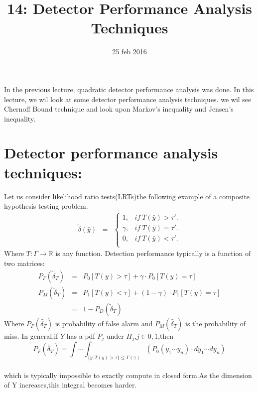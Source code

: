 \documentclass[a4paper,english,12pt]{article}
\title{14: Detector Performance Analysis Techniques}
\date{25 feb 2016}
\author{}
\begin{document}
\maketitle
\maketitle
In the previous lecture, quadratic detector performance analysis was done. In this lecture, we wil look at some detector performance analysis techniques. we wil see Chernoff Bound technique and look upon Markov's inequality and Jensen's inequality.
\section{Detector performance analysis techniques:}
Let us consider likelihood ratio tests(LRTs)the following example of a composite hypothesis testing problem.
\begin{eqnarray}
\tilde{\delta}(\bar{y}) &=&
\begin{cases}
1, &if~ T(\bar{y}) > \tau'.\\
\gamma, &if~  T(\bar{y}) = \tau'.\\
0, &if~ T(\bar{y}) < \tau'.\\
\end{cases}
\end{eqnarray}
Where $T: \Gamma\rightarrow\mathbb{R}$ is any function.
Detection performance typically is a function of two matrices:
\begin{eqnarray}
P_F(\tilde\delta_T) &=& P_0[T(y)>\tau]+\gamma\cdot P_0[T(y)=\tau]\\
P_M(\tilde\delta_T) &=& P_1[T(y)<\tau]+(1-\gamma)\cdot P_1[T(y)=\tau]\\
&=& 1-P_D(\tilde\delta_T)
\end{eqnarray}
Where $P_F(\tilde{\delta_T})$ is probability of false alarm and $P_M(\tilde{\delta_T})$ is the probability of miss.
In general,if $Y$ has a pdf $P_j$ under $H_j$,$j\in {0,1}$,then\\
\[P_F(\tilde{\delta_T})=\int\cdots\int_{\{y:T(y)>\tau\} \leq\Gamma(\gamma)} (P_0(y_1\cdots y_n)\cdot dy_1\cdots dy_n)\]\\
 which is typically impossible to exactly compute in closed form.As the dimension of Y increases,this integral becomes harder. 
\end{document}

